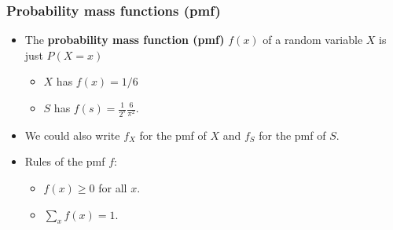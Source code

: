 \documentclass[handout]{beamer}\usepackage[]{graphicx}\usepackage[]{color}
\numberwithin{equation}{section}
\begin{document}
\begin{frame}
\frametitle{Probability mass functions (pmf)}
\begin{itemize}
\pause \item The {\bf probability mass function (pmf)} $f(x)$ of a random variable $X$ is just $P(X = x)$
\begin{itemize}
\pause \item $X$ has $f(x) = 1/6$
\pause \item $S$ has $f(s) = \frac{1}{2^s} \frac{6}{\pi^2}$.
\end{itemize}
\pause \item We could also write $f_X$ for the pmf of $X$ and $f_S$ for the pmf of $S$. 
\pause \item \color{blue} Rules of the pmf $f$:
\begin{itemize}
\pause \item \color{blue} $f(x) \ge 0$ for all $x$.
\pause \item \color{blue} $\sum_x f(x) = 1$. 
\end{itemize}
\end{itemize}
\color{black}
\end{frame}
\end{document}
